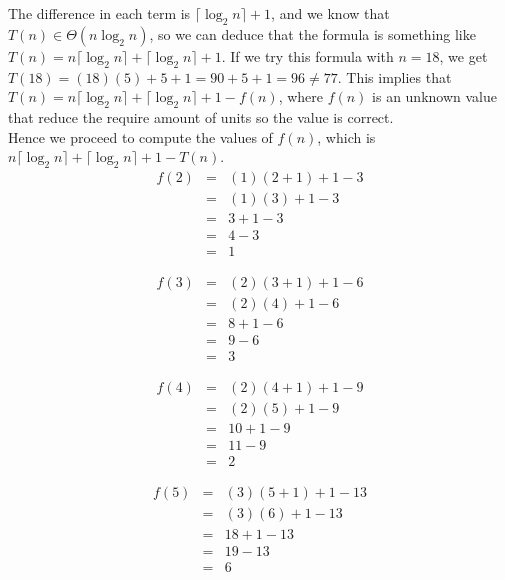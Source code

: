 \documentclass[12pt]{scrartcl}
\begin{document}
\begin{enumerate}
	The difference in each term is $\lceil \log_2 n \rceil + 1$, and we know that $T(n) \in \Theta(n \log_2 n)$, so we can deduce that the formula is something like $T(n) = n \lceil \log_2 n \rceil + \lceil \log_2 n \rceil + 1$. If we try this formula with $n = 18$, we get $T(18) = (18)(5) + 5 + 1 = 90 + 5 + 1 = 96 \neq 77$. This implies that $T(n) = n \lceil \log_2 n \rceil + \lceil \log_2 n \rceil + 1 - f(n)$, where $f(n)$ is an unknown value that reduce the require amount of units so the value is correct.\\
	Hence we proceed to compute the values of $f(n)$, which is $ n \lceil \log_2 n \rceil + \lceil \log_2 n \rceil + 1 - T(n)$.
	\\
	
	\begin{eqnarray}
		f(2)		&	=	& 	(1)(2 + 1)  + 1 - 3\nonumber \\
				&	=	&	(1)(3) + 1 - 3 \nonumber \\
				&	=	&	3 + 1 - 3 \nonumber \\
				&	=	&	4 - 3 \nonumber \\
				&	=	&	1 \nonumber
	\end{eqnarray}		
	
	\begin{eqnarray}
		f(3)		&	=	& 	(2)(3 + 1)  + 1 - 6\nonumber \\
				&	=	&	(2)(4) + 1 - 6 \nonumber \\
				&	=	&	8 + 1 - 6 \nonumber \\
				&	=	&	9 - 6 \nonumber \\
				&	=	&	3 \nonumber
	\end{eqnarray}	
	
	\begin{eqnarray}
		f(4)		&	=	& 	(2)(4 + 1)  + 1 - 9\nonumber \\
				&	=	&	(2)(5) + 1 - 9 \nonumber \\
				&	=	&	10 + 1 - 9 \nonumber \\
				&	=	&	11 - 9 \nonumber \\
				&	=	&	2 \nonumber
	\end{eqnarray}	
	
	\begin{eqnarray}
		f(5)		&	=	& 	(3)(5 + 1)  + 1 - 13\nonumber \\
				&	=	&	(3)(6) + 1 - 13 \nonumber \\
				&	=	&	18+ 1 - 13 \nonumber \\
				&	=	&	19 - 13 \nonumber \\
				&	=	&	6 \nonumber
	\end{eqnarray}		
	

\end{enumerate}
\end{document}
